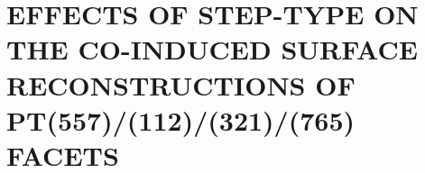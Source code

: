 
\chapter{EFFECTS OF STEP-TYPE ON THE CO-INDUCED SURFACE RECONSTRUCTIONS OF PT(557)/(112)/(321)/(765) FACETS}
